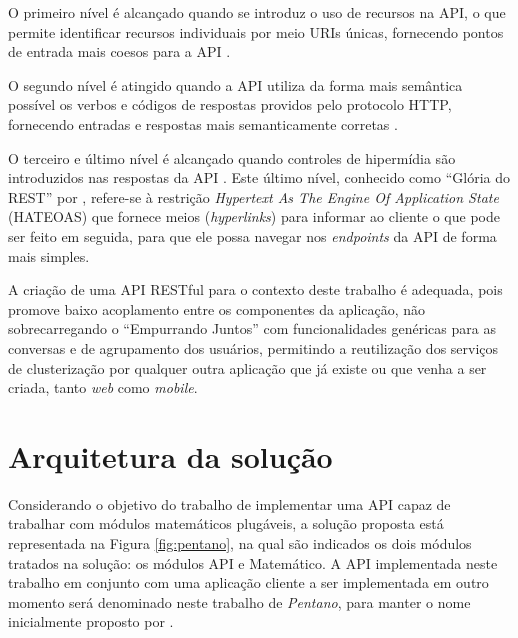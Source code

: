       O primeiro nível é alcançado quando se introduz o uso de recursos na API,
      o que permite identificar recursos individuais por meio URIs únicas,
      fornecendo pontos de entrada mais coesos para a API \cite{fowler10} \cite{richardson09}.
      
      O segundo nível é atingido quando a API utiliza da forma mais semântica possível
      os verbos e códigos de respostas providos pelo protocolo HTTP,
      fornecendo entradas e respostas mais semanticamente corretas \cite{fowler10} \cite{richardson09}.
      
      O terceiro e último nível é alcançado quando controles de hipermídia
      são introduzidos nas respostas da API \cite{fowler10} \cite{richardson09}.
      Este último nível, conhecido como ``Glória do REST'' por ,
      refere-se à restrição \textit{Hypertext As The Engine Of Application State} (HATEOAS) 
      que fornece meios (\textit{hyperlinks}) para informar ao cliente o que pode ser feito em seguida,
      para que ele possa navegar nos \textit{endpoints} da API de forma mais simples.
      
  A criação de uma API RESTful para o contexto deste trabalho é adequada, pois promove baixo acoplamento
  entre os componentes da aplicação, não sobrecarregando o ``Empurrando Juntos'' com funcionalidades genéricas
  para as conversas e de agrupamento dos usuários,
  permitindo a reutilização dos serviços de clusterização por qualquer
  outra aplicação que já existe ou que venha a ser criada, tanto \textit{web} como \textit{mobile}.
  
\section{Arquitetura da solução} \label{architecture}
    
    Considerando o objetivo do trabalho de implementar uma API capaz de trabalhar com 
    módulos matemáticos plugáveis, a solução proposta está representada na Figura \ref{fig:pentano}, 
    na qual são indicados os dois módulos tratados na solução: os módulos API e Matemático. 
    A API implementada neste trabalho em conjunto com uma aplicação cliente a ser implementada em outro momento
    será denominado neste trabalho de \textit{Pentano}, para manter o nome inicialmente proposto por .
    
